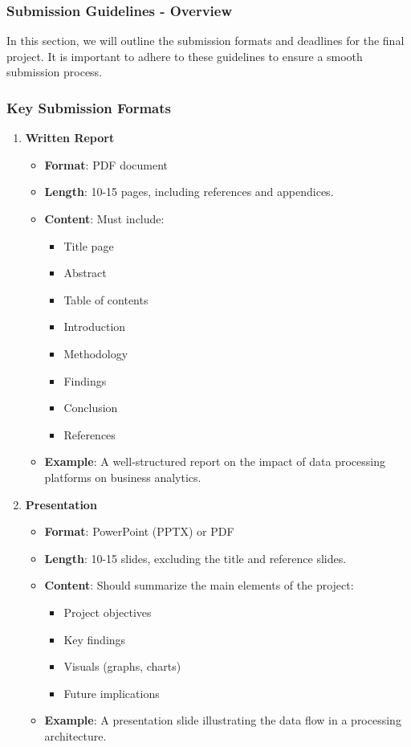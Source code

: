\documentclass[aspectratio=169]{beamer}
\begin{document}
\begin{frame}[fragile]
    \frametitle{Submission Guidelines - Overview}
    In this section, we will outline the submission formats and deadlines for the final project. It is important to adhere to these guidelines to ensure a smooth submission process.
\end{frame}

\begin{frame}[fragile]
    \frametitle{Key Submission Formats}
    \begin{enumerate}
        \item \textbf{Written Report}
        \begin{itemize}
            \item \textbf{Format}: PDF document
            \item \textbf{Length}: 10-15 pages, including references and appendices.
            \item \textbf{Content}: Must include:
            \begin{itemize}
                \item Title page
                \item Abstract
                \item Table of contents
                \item Introduction
                \item Methodology
                \item Findings
                \item Conclusion
                \item References
            \end{itemize}
            \item \textbf{Example}: A well-structured report on the impact of data processing platforms on business analytics.
        \end{itemize}

        \item \textbf{Presentation}
        \begin{itemize}
            \item \textbf{Format}: PowerPoint (PPTX) or PDF
            \item \textbf{Length}: 10-15 slides, excluding the title and reference slides.
            \item \textbf{Content}: Should summarize the main elements of the project:
            \begin{itemize}
                \item Project objectives
                \item Key findings
                \item Visuals (graphs, charts)
                \item Future implications
            \end{itemize}
            \item \textbf{Example}: A presentation slide illustrating the data flow in a processing architecture.
        \end{itemize}
    \end{enumerate}
\end{frame}
\end{document}
